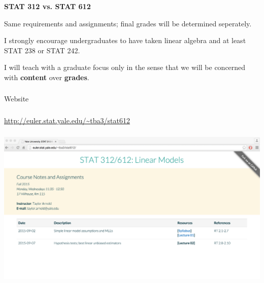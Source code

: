 \begin{frame}[fragile] \frametitle{}

{\bf STAT 312 vs. STAT 612} \pause

Same requirements and assignments; final grades will be determined
seperately. \pause

I strongly encourage undergraduates to have taken linear
algebra and at least STAT 238 or STAT 242. \pause

I will teach with a graduate focus only in the sense that we
will be concerned with {\bf content} over {\bf grades}.

\end{frame}

\begin{frame}[fragile] \frametitle{}

\begin{flushright}
{\color{yaleblue}\sc\fontsize{1cm}{0cm}\selectfont Website}
\end{flushright}

\end{frame}


\begin{frame}[fragile] \frametitle{}

{\fontsize{0.5cm}{0cm}\selectfont
\url{http://euler.stat.yale.edu/~tba3/stat612}
}

\end{frame}

\begin{frame}[fragile] \frametitle{}

\includegraphics[width=\linewidth]{img/websiteScreenshot.pdf}

\end{frame}

